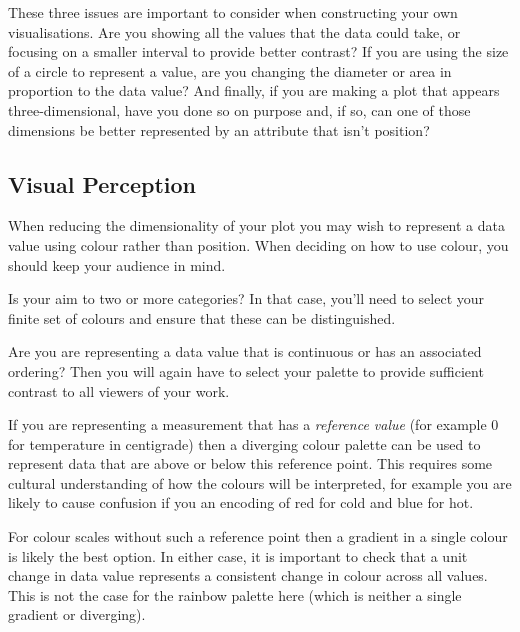 \documentclass[
  12pt,
]{book}
\begin{document}
These three issues are important to consider when constructing your own visualisations. Are you showing all the values that the data could take, or focusing on a smaller interval to provide better contrast? If you are using the size of a circle to represent a value, are you changing the diameter or area in proportion to the data value? And finally, if you are making a plot that appears three-dimensional, have you done so on purpose and, if so, can one of those dimensions be better represented by an attribute that isn't position?

\hypertarget{visual-perception}{%
\subsection{Visual Perception}\label{visual-perception}}

When reducing the dimensionality of your plot you may wish to represent a data value using colour rather than position. When deciding on how to use colour, you should keep your audience in mind.

Is your aim to two or more categories? In that case, you'll need to select your finite set of colours and ensure that these can be distinguished.

Are you are representing a data value that is continuous or has an associated ordering? Then you will again have to select your palette to provide sufficient contrast to all viewers of your work.

If you are representing a measurement that has a \emph{reference value} (for example 0 for temperature in centigrade) then a diverging colour palette can be used to represent data that are above or below this reference point. This requires some cultural understanding of how the colours will be interpreted, for example you are likely to cause confusion if you an encoding of red for cold and blue for hot.

For colour scales without such a reference point then a gradient in a single colour is likely the best option. In either case, it is important to check that a unit change in data value represents a consistent change in colour across all values. This is not the case for the rainbow palette here (which is neither a single gradient or diverging).
\end{document}
